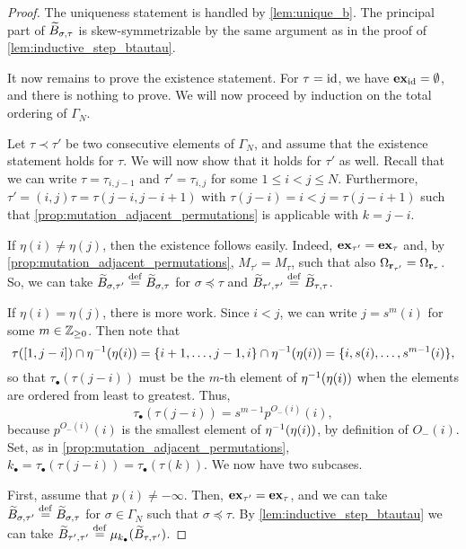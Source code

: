\begin{proof}
	The uniqueness statement is handled by \cref{lem:unique_b}. The principal part of $\widetilde{B}_{\sigma, \tau}$ is skew-symmetrizable by the same argument as in the proof of \cref{lem:inductive_step_btautau}.

	It now remains to prove the existence statement. For $\tau = \operatorname{id}$, we have $\mathbf{ex}_{\operatorname{id}} =
		\emptyset$, and there is nothing to prove. We will now proceed by induction on the
	total ordering of $\Gamma_N$.

	Let $\tau \prec \tau'$ be two consecutive elements of $\Gamma_N$, and assume that the
	existence statement holds for $\tau$. We will now show that it holds for $\tau'$ as
	well. Recall that we can write $\tau = \tau_{i, j-1}$ and $\tau' = \tau_{i, j}$ for
	some $1 \leq i < j \leq N$. Furthermore, $\tau' = (i, j)\tau = \tau(j-i, j-i+1)$ with
	$\tau(j-i) = i < j = \tau(j - i +1)$ such that
	\cref{prop:mutation_adjacent_permutations} is applicable with $k = j - i$.

	If $\eta(i) \neq \eta(j)$, then the existence follows easily. Indeed, $\mathbf{ex}_{\tau'} =
		\mathbf{ex}_\tau$ and, by \cref{prop:mutation_adjacent_permutations}, $M_{\tau'} = M_\tau$,
	such that also $\Omega_{\mathbf{r}_{\tau'}} = \Omega_{\mathbf{r}_\tau}$. So, we can take
	$\widetilde{B}_{\sigma, \tau'} \overset{\mathrm{def}}{=} \widetilde{B}_{\sigma, \tau}$ for $\sigma \preceq \tau$ and
	$\widetilde{B}_{\tau', \tau'} \overset{\mathrm{def}}{=} \widetilde{B}_{\tau, \tau}$.

	If $\eta(i) = \eta(j)$, there is more work. Since $i < j$, we can write $j = s^m(i)$
	for some $m \in \mathbb{Z}_{\geq 0}$. Then note that
	\begin{equation*}
		\tau([1, j-i]) \cap \eta^{-1}(\eta(i)) = \{i+1, \dots, j-1, i\} \cap \eta^{-1}(\eta(i))= \{i, s(i), \dots, s^{m- 1}(i)\},
	\end{equation*}
	so that $\tau_\bullet(\tau(j-i))$ must be the $m$-th element of $\eta^{-1}(\eta(i))$
	when the elements are ordered from least to greatest. Thus,
	\begin{equation*}
		\tau_\bullet (\tau(j- i)) = s^{m-1}p^{O_{-}(i)}(i),
	\end{equation*}
	because $p^{O_{-}(i)}(i)$ is the smallest element of $\eta^{-1}(\eta(i))$, by definition of $O_{-}(i)$. Set, as in \cref{prop:mutation_adjacent_permutations}, $k_\bullet = \tau_\bullet(\tau(j-i)) = \tau_\bullet(\tau(k))$. We now have two subcases.

	First, assume that $p(i) \neq -\infty$. Then, $\mathbf{ex}_{\tau'} = \mathbf{ex}_{\tau}$, and we can
	take $\widetilde{B}_{\sigma, \tau'} \overset{\mathrm{def}}{=} \widetilde{B}_{\sigma, \tau}$ for $\sigma \in \Gamma_N$ such
	that $\sigma \preceq \tau$. By \cref{lem:inductive_step_btautau} we can take
	$\widetilde{B}_{\tau', \tau'} \overset{\mathrm{def}}{=} \mu_{k_\bullet}(\widetilde{B}_{\tau, \tau'})$.


\end{proof}
